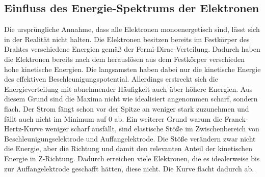 \subsection{Einfluss des Energie-Spektrums der Elektronen}
Die ursprüngliche Annahme, dass alle Elektronen monoenergetisch sind, lässt sich in der 
Realität nicht halten. Die Elektronen besitzen bereits im Festkörper des Drahtes verschiedene Energien
gemäß der Fermi-Dirac-Verteilung. Dadurch haben die Elektronen bereits nach dem herauslösen 
aus dem Festkörper verschieden hohe kinetische Energien. Die langsamsten haben dabei nur die 
kinetische Energie des effektiven Beschleunigungspotential. Allerdings erstreckt sich die Energieverteilung mit abnehmender Häufigkeit 
auch über höhere Energien. Aus diesem Grund sind die Maxima nicht wie idealisiert angenommen 
scharf, sondern flach. Der Strom fängt schon vor der Spitze an weniger stark zuzunehmen und fällt auch nicht im Minimum auf 0 ab.
Ein weiterer Grund warum die Franck-Hertz-Kurve weniger scharf ausfällt, sind elastische Stöße im Zwischenbereich von 
Beschleunigungselektrode und Auffangelektrode. Die Stöße verändern zwar nicht die Energie, aber die Richtung und damit den relevanten Anteil 
der kinetischen Energie in Z-Richtung. Dadurch erreichen viele Elektronen, die es idealerweise bis zur Auffangelektrode geschafft hätten, diese 
nicht. Die Kurve flacht dadurch ab.
